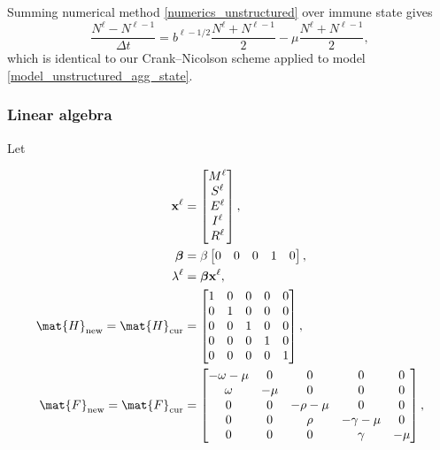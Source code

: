 \documentclass{jpmarticle}
\renewcommand{\vec}[1]{\boldsymbol{\mathrm{#1}}}
\let\subequationsorig\subequations%
\let\endsubequationsorig\endsubequations%
\renewenvironment{subequations}{
  \subequationsorig
  \renewcommand{\theequation}{\theparentequation.\arabic{equation}}
}{
  \endsubequationsorig
}
\begin{document}
Summing numerical method \eqref{numerics_unstructured} over
immune state gives
\begin{equation}
  \label{numerics_unstructured_agg_state}
  \frac{N^{\ell} - N^{\ell - 1}}{\Delta t}
  = b^{\ell - 1 / 2} \frac{N^{\ell} + N^{\ell - 1}}{2}
  - \mu \frac{N^{\ell} + N^{\ell - 1}}{2},
\end{equation}
which is identical to our Crank--Nicolson scheme applied to model
\eqref{model_unstructured_agg_state}.


\subsubsection{Linear algebra}

Let
\begin{subequations}
  \begin{align}
    \vec{x}^{\ell} &=
    \begin{bmatrix}
      M^{\ell} \\ S^{\ell} \\ E^{\ell} \\ I^{\ell} \\ R^{\ell}
    \end{bmatrix},
    \\
    \vec{\beta} &=
    \beta
    \begin{bmatrix}
      0 & 0 & 0 & 1 & 0
    \end{bmatrix},
    \\
    \lambda^{\ell} &=
    \vec{\beta} \vec{x}^{\ell},
    \\
    \mat{H}_{\mathrm{new}} =
    \mat{H}_{\mathrm{cur}} &=
    \begin{bmatrix}
      1 & 0 & 0 & 0 & 0 \\
      0 & 1 & 0 & 0 & 0 \\
      0 & 0 & 1 & 0 & 0 \\
      0 & 0 & 0 & 1 & 0 \\
      0 & 0 & 0 & 0 & 1
    \end{bmatrix},
    \\
    \mat{F}_{\mathrm{new}} =
    \mat{F}_{\mathrm{cur}} &=
    \begin{bmatrix}
      - \omega - \mu & 0 & 0 & 0 & 0 \\
      \omega & - \mu & 0 & 0 & 0 \\
      0 & 0 & - \rho - \mu & 0 & 0 \\
      0 & 0 & \rho & - \gamma - \mu & 0 \\
      0 & 0 & 0 & \gamma & - \mu
    \end{bmatrix},

\end{align}
\end{subequations}
\end{document}
